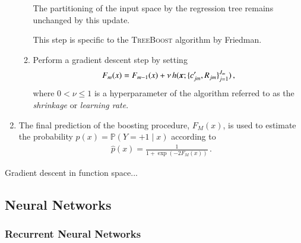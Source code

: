\begin{enumerate}
\begin{enumerate}
    The partitioning of the input space by the regression tree remains unchanged
    by this update.

    This step is specific to the \textsc{TreeBoost} algorithm by Friedman.

  \item Perform a gradient descent step by setting
    \begin{align*}
      F_m(x) = F_{m - 1}(x) + \nu \, h(\myvec{x}; \{c_{jm}^\prime, R_{jm}\}_{j=1}^{J_{m}}) \,\text{,}
    \end{align*}
    where $0 < \nu \leq 1$ is a hyperparameter of the algorithm referred to as
    the \emph{shrinkage} or \emph{learning rate}.

  \end{enumerate}

\item The final prediction of the boosting procedure, $F_{M}(x)$, is used to
  estimate the probability $p(x) = \mathbb{P}(Y = +1 \mid x)$ according to
  \begin{align*}
    \hat{p}(x) = \frac{1}{1 + \exp(-2 F_{M}(x))} \,\text{.}
  \end{align*}
\end{enumerate}

Gradient descent in function space...


\subsection{Neural Networks}

\subsubsection{Recurrent Neural Networks}%
\label{sec:rnn}


